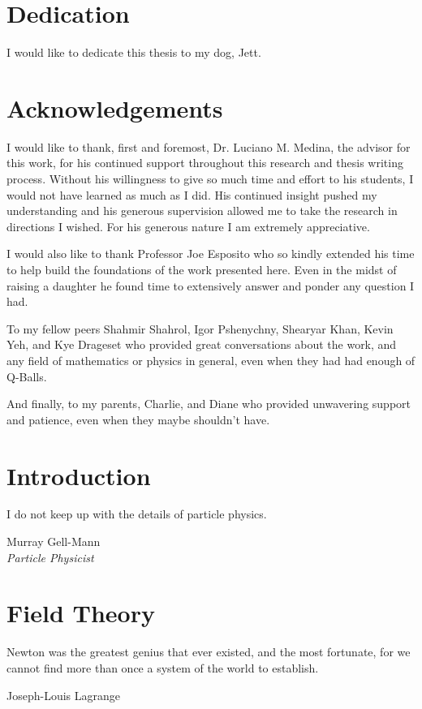 \documentclass[12pt]{report}
\theoremstyle{definition}
\begin{document}
\thispagestyle{empty}
 
\listoffigures
\begingroup
\let\clearpage\relax
\listoftables
\endgroup

\chapter*{Dedication}
I would like to dedicate this thesis to my dog, Jett.

\chapter*{Acknowledgements}
I would like to thank, first and foremost, Dr. Luciano M. Medina, the advisor for this work, for his continued support throughout this research and thesis writing process. Without his willingness to give so much time and effort to his students, I would not have learned as much as I did. His continued insight pushed my understanding and his generous supervision allowed me to take the research in directions I wished. For his generous nature I am extremely appreciative.

I would also like to thank Professor Joe Esposito who so kindly extended his time to help build the foundations of the work presented here. Even in the midst of raising a daughter he found time to extensively answer and ponder any question I had.

To my fellow peers Shahmir Shahrol, Igor Pshenychny, Shearyar Khan, Kevin Yeh, and Kye Drageset who provided great conversations about the work, and any field of mathematics or physics in general, even when they had had enough of Q-Balls.

And finally, to my parents, Charlie, and Diane who provided unwavering support and patience, even when they maybe shouldn't have.


\tableofcontents

\chapter{Introduction}\label{chap:intro}
\epigraph{I do not keep up with the details of particle physics.}{Murray Gell-Mann\\\textit{Particle Physicist}}


\chapter{Field Theory}\label{chap:fields}
\epigraph{Newton was the greatest genius that ever existed, and the most fortunate, for we cannot find more than once a system of the world to establish.}{Joseph-Louis Lagrange}

\end{document}
